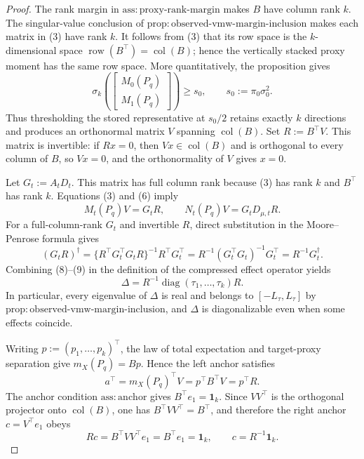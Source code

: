 \documentclass{article}
\begin{document}
\begin{proof}
The rank margin in \(\mathrm{ass:proxy\text{-}rank\text{-}margin}\) makes \(B\) have column rank \(k\).  The singular-value conclusion of \(\mathrm{prop:observed\text{-}vmw\text{-}margin\text{-}inclusion}\) makes each matrix in (3) have rank \(k\).  It follows from (3) that its row space is the \(k\)-dimensional space \(\operatorname{row}(B^\top)=\operatorname{col}(B)\); hence the vertically stacked proxy moment has the same row space.  More quantitatively, the proposition gives
\[
\sigma_k\!\left(\begin{bmatrix}M_0(P_q)\\M_1(P_q)\end{bmatrix}\right)
\ge s_0,\qquad s_0:=\pi_0\sigma_0^2. \tag{7}
\]
Thus thresholding the stored representative at \(s_0/2\) retains exactly \(k\) directions and produces an orthonormal matrix \(V\) spanning \(\operatorname{col}(B)\).  Set \(R:=B^\top V\).  This matrix is invertible: if \(Rx=0\), then \(Vx\in\operatorname{col}(B)\) and is orthogonal to every column of \(B\), so \(Vx=0\), and the orthonormality of \(V\) gives \(x=0\).

Let \(G_t:=A_tD_t\).  This matrix has full column rank because (3) has rank \(k\) and \(B^\top\) has rank \(k\).  Equations (3) and (6) imply
\[
M_t(P_q)V=G_tR,
\qquad
N_t(P_q)V=G_tD_{\mu,t}R. \tag{8}
\]
For a full-column-rank \(G_t\) and invertible \(R\), direct substitution in the Moore--Penrose formula gives
\[
(G_tR)^\dagger
=\{R^\top G_t^\top G_tR\}^{-1}R^\top G_t^\top
=R^{-1}(G_t^\top G_t)^{-1}G_t^\top
=R^{-1}G_t^\dagger. \tag{9}
\]
Combining (8)--(9) in the definition of the compressed effect operator yields
\[
\Delta
=R^{-1}\operatorname{diag}(\tau_1,\ldots,\tau_k)R. \tag{10}
\]
In particular, every eigenvalue of \(\Delta\) is real and belongs to \([-L_{\tau},L_{\tau}]\) by \(\mathrm{prop:observed\text{-}vmw\text{-}margin\text{-}inclusion}\), and \(\Delta\) is diagonalizable even when some effects coincide.

Writing \(p:=(p_1,\ldots,p_k)^\top\), the law of total expectation and target-proxy separation give \(m_X(P_q)=Bp\).  Hence the left anchor satisfies
\[
a^\top=m_X(P_q)^\top V=p^\top B^\top V=p^\top R. \tag{11}
\]
The anchor condition \(\mathrm{ass:anchor}\) gives \(B^\top e_1=\mathbf 1_k\).  Since \(VV^\top\) is the orthogonal projector onto \(\operatorname{col}(B)\), one has \(B^\top VV^\top=B^\top\), and therefore the right anchor \(c=V^\top e_1\) obeys
\[
Rc=B^\top VV^\top e_1=B^\top e_1=\mathbf 1_k,
\qquad c=R^{-1}\mathbf 1_k. \tag{12}
\]


\end{proof}
\end{document}
